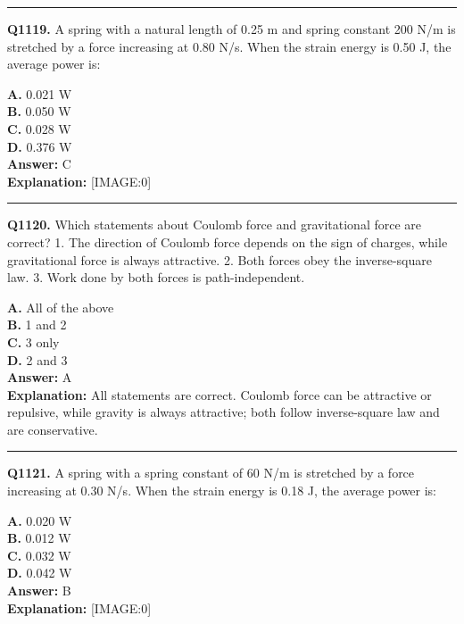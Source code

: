 \documentclass[12pt]{article}
\begin{document}
\hrule
\vspace{1em}


\noindent
\textbf{Q1119.} A spring with a natural length of 0.25 m and spring constant 200 N/m is stretched by a force increasing at 0.80 N/s. When the strain energy is 0.50 J, the average power is:



\textbf{A.} 0.021 W \\
\textbf{B.} 0.050 W \\
\textbf{C.} 0.028 W \\
\textbf{D.} 0.376 W \\

\textbf{Answer:} C \\
\textbf{Explanation:} [IMAGE:0]

\hrule
\vspace{1em}


\noindent
\textbf{Q1120.} Which statements about Coulomb force and gravitational force are correct?
1.
The direction of Coulomb force depends on the sign of charges, while gravitational force is always attractive.
2.
Both forces obey the inverse-square law.
3. Work done by both forces is path-independent.



\textbf{A.} All of the above \\
\textbf{B.} 1 and 2 \\
\textbf{C.} 3 only \\
\textbf{D.} 2 and 3 \\

\textbf{Answer:} A \\
\textbf{Explanation:} All statements are correct. Coulomb force can be attractive or repulsive, while gravity is always attractive; both follow inverse-square law and are conservative.

\hrule
\vspace{1em}


\noindent
\textbf{Q1121.} A spring with a spring constant of 60 N/m is stretched by a force increasing at 0.30 N/s. When the strain energy is 0.18 J, the average power is:



\textbf{A.} 0.020 W \\
\textbf{B.} 0.012 W \\
\textbf{C.} 0.032 W \\
\textbf{D.} 0.042 W \\

\textbf{Answer:} B \\
\textbf{Explanation:} [IMAGE:0]
\end{document}
